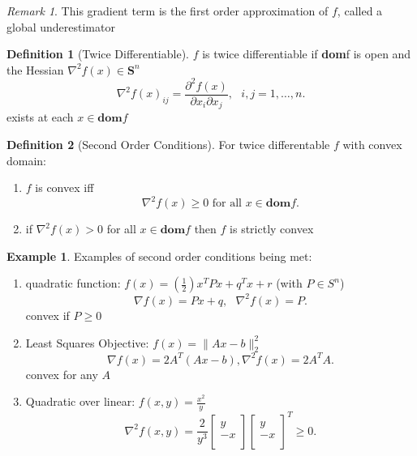 \documentclass{report}
\theoremstyle{remark} \newtheorem{remark}{Remark}[section]
\theoremstyle{definition}
\newtheorem{definition}{Definition}[section]
\theoremstyle{definition}
\newtheorem{example}{Example}[section]
\theoremstyle{definition}
\theoremstyle{remark}
\begin{document}
\begin{remark}
    This gradient term is the first order approximation of $f$, called a global underestimator   
\end{remark}

\begin{definition}[Twice Differentiable]
      $f$ is twice differentiable if \textbf{dom}f is open and the Hessian $\nabla^2 f(x)\in \textbf{S}^{n}$
      \[
      \nabla^2 f(x)_{ij} = \frac{\partial^2 f(x)}{\partial x_i \partial x_j}, \text{   } i,j = 1,\ldots,n
      .\] 
      exists at each $x\in\textbf{dom}f$
\end{definition}


\begin{definition}[Second Order Conditions]
      For twice differentable $f$ with convex domain:
      \begin{enumerate}
          \item $f$ is convex iff
              \[
              \nabla^2f(x) \ge  0 \text{ for all } x\in\textbf{dom}f
              .\] 
              \item if $\nabla^2f(x)> 0$ for all $x\in\textbf{dom}f$ then $f$ is strictly convex
      \end{enumerate}
\end{definition}

\begin{example}
    Examples of second order conditions being met:
    \begin{enumerate}
        \item quadratic function: $f(x) = (\frac{1}{2})x^{T}Px + q^{T}x + r$ (with $P\in S^{n}$)
            \[
            \nabla f(x) = Px + q, \text{      } \nabla^2f(x) = P
            .\] 
convex if $P \ge 0$
\item Least Squares Objective: $f(x) = \|Ax - b\|_2^{2}$ 
    \[
    \nabla f(x) = 2A^{T}(Ax-b), \nabla^2f(x) = 2A^{T}A 
    .\] 
       convex for any $A$ 
       \item Quadratic over linear: $f(x,y) = \frac{x^2}{y}$ 
           \[
           \nabla^2f(x,y) = \frac{2}{y^3}
\begin{bmatrix}
    y \\
    -x \\
\end{bmatrix}
\begin{bmatrix}
    y \\
    -x \\
\end{bmatrix}^{T} \ge 0
           .\] 
    \end{enumerate} 
\end{example}
\end{document}

